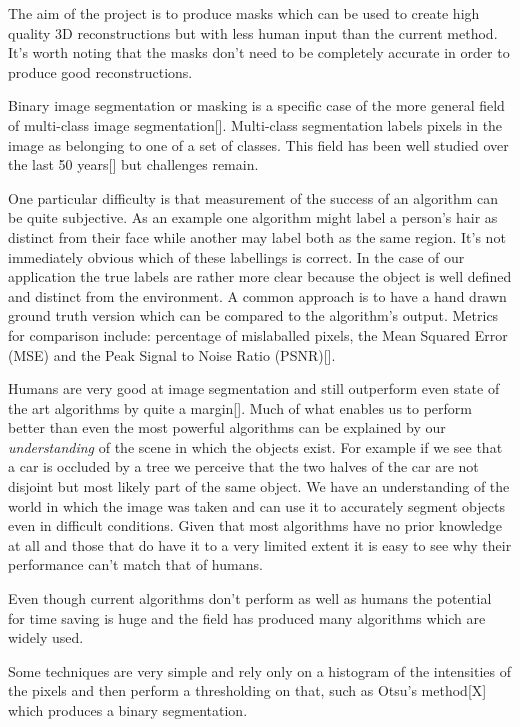 \documentclass[12pt]{IIBproject}
\begin{document}
The aim of the project is to produce masks which can be used to create high quality 3D reconstructions but with less human input than the current method. It's worth noting that the masks don't need to be completely accurate in order to produce good reconstructions.

Binary image segmentation or masking is a specific case of the more general field of multi-class image segmentation[]. Multi-class segmentation labels pixels in the image as belonging to one of a set of classes. This field has been well studied over the last 50 years[] but challenges remain. 

One particular difficulty is that measurement of the success of an algorithm can be quite subjective. As an example one algorithm might label a person's hair as distinct from their face while another may label both as the same region. It's not immediately obvious which of these labellings is correct. In the case of our application the true labels are rather more clear because the object is well defined and distinct from the environment. A common approach is to have a hand drawn ground truth version which can be compared to the algorithm's output. Metrics for comparison include: percentage of mislaballed pixels, the Mean Squared Error (MSE) and the Peak Signal to Noise Ratio (PSNR)[].  

Humans are very good at image segmentation and still outperform even state of the art algorithms by quite a margin[]. Much of what enables us to perform better than even the most powerful algorithms can be explained by our \emph{understanding} of the scene in which the objects exist. For example if we see that a car is occluded by a tree we perceive that the two halves of the car are not disjoint but most likely part of the same object. We have an understanding of the world in which the image was taken and can use it to accurately segment objects even in difficult conditions. Given that most algorithms have no prior knowledge at all and those that do have it to a very limited extent it is easy to see why their performance can't match that of humans.

Even though current algorithms don't perform as well as humans the potential for time saving is huge and the field has produced many algorithms which are widely used. 

Some techniques are very simple and rely only on a histogram of the intensities of the pixels and then perform a thresholding on that, such as Otsu's method[X] which produces a binary segmentation. 
\end{document}
